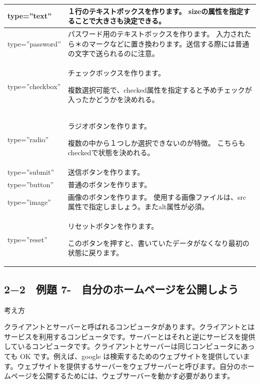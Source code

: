 \documentclass[a4paper,12pt,dvipdfmx]{jarticle}
\newcounter{Exercise}
\renewcommand\theExercise{例題 7-\arabic{Exercise}}
\begin{document}
\begin{flushleft}
	\tablefirsthead{}
	\tablehead{}
	\tabletail{}
	\tablelasttail{}
	\begin{supertabular}{|m{3.4459999cm}|m{7.9160004cm}|}
		\hline
		type=”text” &
		１行のテキストボックスを作ります。\newline
		sizeの属性を指定することで大きさも決定できる。\\\hline
		type=”password” &
		パスワード用のテキストボックスを作ります。\newline
		入力されたら＊のマークなどに置き換わります。送信する際には普通の文字で送られるのに注意。\\\hline
		type=”checkbox” &
		チェックボックスを作ります。

		複数選択可能で、checked属性を指定すると予めチェックが入ったかどうかを決めれる。\\\hline
		type=”radio” &
		ラジオボタンを作ります。

		複数の中から１つしか選択できないのが特徴。\newline
		こちらもcheckedで状態を決めれる。\\\hline
		type=”submit” &
		送信ボタンを作ります。\\\hline
		type=”button” &
		普通のボタンを作ります。\\\hline
		type=”image” &
		画像のボタンを作ります。\newline
		使用する画像ファイルは、src属性で指定しましょう。またalt属性が必須。\\\hline
		type=”reset” &
		リセットボタンを作ります。

		このボタンを押すと、書いていたデータがなくなり最初の状態に戻ります。\\\hline
	\end{supertabular}
\end{flushleft}

\bigskip

\clearpage\subsection*{2−2　\theExercise　自分のホームページを公開しよう}
考え方

クライアントとサーバーと呼ばれるコンピュータがあります。クライアントとはサービスを利用するコンピュータです。サーバーとはそれと逆にサービスを提供しているコンピュータです。クライアントとサーバーは同じコンピュータにあっても
OK です。例えば、google
は検索するためのウェブサイトを提供しています。ウェブサイトを提供するサーバーをウェブサーバーと呼びます。自分のホームページを公開するためには、ウェブサーバーを動かす必要があります。
\end{document}
